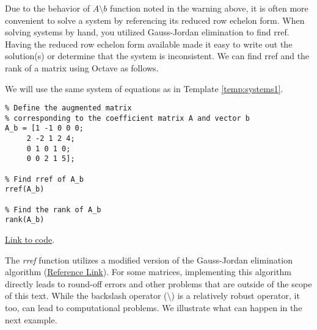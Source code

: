 \documentclass{ximera}
\begin{document}
Due to the behavior of $A\setminus b$ function noted in the warning above, it is often more convenient to solve a system by referencing its reduced row echelon form.  When solving systems by hand, you utilized Gauss-Jordan elimination to find rref.  Having the reduced row echelon form available made it easy to write out the solution(s) or determine that the system is inconsistent.  We can find rref and the rank of a matrix using Octave as follows.

\begin{template}\label{temp:rref}
We will use the same system of equations as in Template \ref{temp:systems1}.
    \begin{verbatim}
% Define the augmented matrix 
% corresponding to the coefficient matrix A and vector b
A_b = [1 -1 0 0 0;
     2 -2 1 2 4;
     0 1 0 1 0;
     0 0 2 1 5];
     
% Find rref of A_b
rref(A_b)

% Find the rank of A_b
rank(A_b)
    \end{verbatim}

\href{https://sagecell.sagemath.org/?z=eJxFjsEKwjAMhu-FvsN_Gehh0A49iYfB8CVEpOvSWWSt1Co-vumkmBCS_-cjSYOBnA-EfCOY17xQyDRhMTn5D2xMiZ6PGCYfZuS4UjaSc956JivXw4QJb7I5JoxS9NcRR5w1Wg1V8iAFSnRoO2huu-oo6F_9DYXC7C_VkaLByfMBfsYhOvB6KYrY8LSVgoUJ91V8ASwdNw8=&lang=octave&interacts=eJyLjgUAARUAuQ==}{Link to code}.    
\end{template}

\begin{warning}
    The \emph{rref} function utilizes a modified version of the Gauss-Jordan elimination algorithm (\href{https://www.mathworks.com/help/matlab/ref/rref.html}{Reference Link}).  For some matrices, implementing this algorithm directly leads to round-off errors and other problems that are outside of the scope of this text.  While the backslash operator ($\setminus$) is a relatively robust operator, it too, can lead to computational problems.  We illustrate what can happen in the next example.   
\end{warning}
\end{document}
